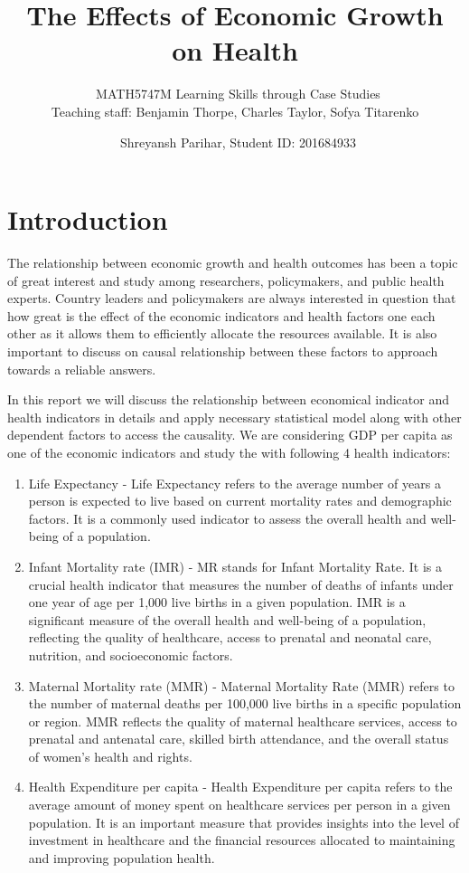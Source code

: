 \documentclass[
]{article}
\title{\vspace{5cm} The Effects of Economic Growth on Health
\vspace{3cm}}
\subtitle{~MATH5747M Learning Skills through Case Studies\\
Teaching staff: Benjamin Thorpe, Charles Taylor, Sofya Titarenko
\vspace{6cm}}
\author{~Shreyansh Parihar, Student ID: 201684933}
\date{}
\providecommand{\tightlist}{%
  \setlength{\itemsep}{0pt}\setlength{\parskip}{0pt}}
\begin{document}
\maketitle

{
\setcounter{tocdepth}{2}
\tableofcontents
}
\newpage

\hypertarget{introduction}{%
\section{Introduction}\label{introduction}}

The relationship between economic growth and health outcomes has been a
topic of great interest and study among researchers, policymakers, and
public health experts. Country leaders and policymakers are always
interested in question that how great is the effect of the economic
indicators and health factors one each other as it allows them to
efficiently allocate the resources available. It is also important to
discuss on causal relationship between these factors to approach towards
a reliable answers.

In this report we will discuss the relationship between economical
indicator and health indicators in details and apply necessary
statistical model along with other dependent factors to access the
causality. We are considering GDP per capita as one of the economic
indicators and study the with following 4 health indicators:

\begin{enumerate}
\def\labelenumi{\arabic{enumi}.}
\tightlist
\item
  Life Expectancy - Life Expectancy refers to the average number of
  years a person is expected to live based on current mortality rates
  and demographic factors. It is a commonly used indicator to assess the
  overall health and well-being of a population.
\item
  Infant Mortality rate (IMR) - MR stands for Infant Mortality Rate. It
  is a crucial health indicator that measures the number of deaths of
  infants under one year of age per 1,000 live births in a given
  population. IMR is a significant measure of the overall health and
  well-being of a population, reflecting the quality of healthcare,
  access to prenatal and neonatal care, nutrition, and socioeconomic
  factors.
\item
  Maternal Mortality rate (MMR) - Maternal Mortality Rate (MMR) refers
  to the number of maternal deaths per 100,000 live births in a specific
  population or region. MMR reflects the quality of maternal healthcare
  services, access to prenatal and antenatal care, skilled birth
  attendance, and the overall status of women's health and rights.
\item
  Health Expenditure per capita - Health Expenditure per capita refers
  to the average amount of money spent on healthcare services per person
  in a given population. It is an important measure that provides
  insights into the level of investment in healthcare and the financial
  resources allocated to maintaining and improving population health.
\end{enumerate}
\end{document}
